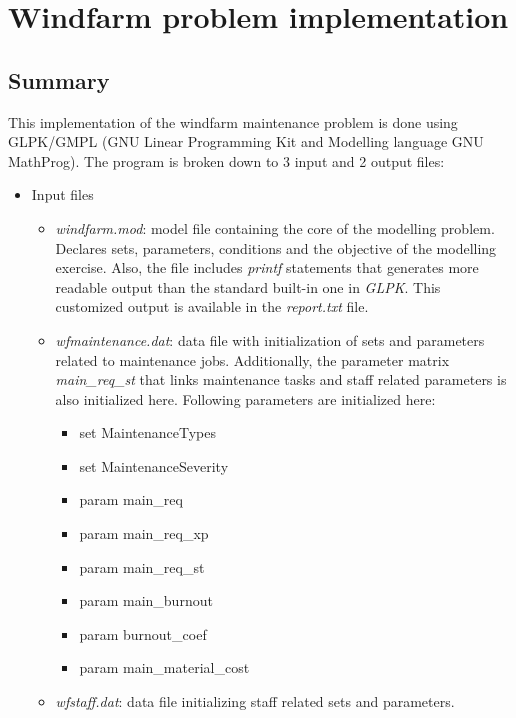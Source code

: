 \section{Windfarm problem implementation}
    \subsection{Summary}
    This implementation of the windfarm maintenance problem is done using GLPK/GMPL
    (GNU Linear Programming Kit and Modelling language GNU MathProg). The program is broken down to
    3 input and 2 output files:
    \begin{itemize}
        \item Input files
            \begin{itemize}
                \item \textit{windfarm.mod}: model file containing the core of the modelling problem.
                Declares sets, parameters, conditions and the objective of the modelling exercise.
                Also, the file includes \textit{printf} statements that generates more readable output
                than the standard built-in one in \textit{GLPK}. This customized output is available in 
                the \textit{report.txt} file.
                \item \textit{wfmaintenance.dat}: data file with initialization of sets and parameters 
                related to maintenance jobs. Additionally, the parameter matrix \textit{main\_req\_st} 
                that links maintenance tasks and staff related parameters is also initialized here.
                Following parameters are initialized here:
                \begin{itemize}
                    \item set MaintenanceTypes
                    \item set MaintenanceSeverity
                    \item param main\_req
                    \item param main\_req\_xp
                    \item param main\_req\_st
                    \item param main\_burnout
                    \item param burnout\_coef
                    \item param main\_material\_cost
                \end{itemize}
                \item \textit{wfstaff.dat}: data file initializing staff related sets and parameters.

\end{itemize}
\end{itemize}

